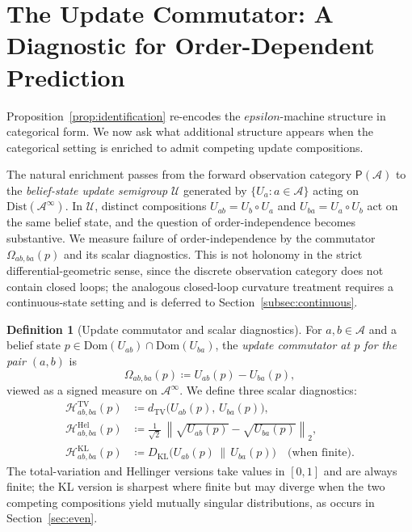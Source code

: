 \documentclass[11pt,a4paper]{article}
\def\varepsilon{epsilon}%
\theoremstyle{plain}
\theoremstyle{definition}
\newtheorem{definition}[theorem]{Definition}
\theoremstyle{remark}
\newcommand{\Dist}{\mathrm{Dist}}
\newcommand{\KL}{D_{\mathrm{KL}}}
\newcommand{\TV}{d_{\mathrm{TV}}}
\newcommand{\eqdef}{\coloneqq}
\newcommand{\PathCat}{\mathsf{P}}
\newcommand{\Alphabet}{\mathcal{A}}
\newcommand{\Dom}{\mathrm{Dom}}
\begin{document}
\section{The Update Commutator: A Diagnostic for Order-Dependent Prediction}
\label{sec:commutator}

Proposition~\ref{prop:identification} re-encodes the $\varepsilon$-machine structure in categorical form. We now ask what additional structure appears when the categorical setting is enriched to admit competing update compositions.

The natural enrichment passes from the forward observation category $\PathCat(\Alphabet)$ to the \emph{belief-state update semigroup} $\mathcal{U}$ generated by $\{ U_a : a \in \Alphabet \}$ acting on $\Dist(\Alphabet^\infty)$. In $\mathcal{U}$, distinct compositions $U_{ab} = U_b \circ U_a$ and $U_{ba} = U_a \circ U_b$ act on the same belief state, and the question of order-independence becomes substantive. We measure failure of order-independence by the commutator $\Omega_{ab,ba}(p)$ and its scalar diagnostics. This is not holonomy in the strict differential-geometric sense, since the discrete observation category does not contain closed loops; the analogous closed-loop curvature treatment requires a continuous-state setting and is deferred to Section~\ref{subsec:continuous}.

\begin{definition}[Update commutator and scalar diagnostics]
\label{def:commutator}
For $a, b \in \Alphabet$ and a belief state $p \in \Dom(U_{ab}) \cap \Dom(U_{ba})$, the \emph{update commutator at $p$ for the pair $(a, b)$} is
\begin{equation}
    \Omega_{ab,ba}(p) \eqdef U_{ab}(p) - U_{ba}(p),
\end{equation}
viewed as a signed measure on $\Alphabet^\infty$. We define three scalar diagnostics:
\begin{align}
    \mathcal{H}^{\mathrm{TV}}_{ab,ba}(p) &\eqdef \TV\bigl(U_{ab}(p),\, U_{ba}(p)\bigr), \\
    \mathcal{H}^{\mathrm{Hel}}_{ab,ba}(p) &\eqdef \frac{1}{\sqrt{2}} \,\left\| \sqrt{U_{ab}(p)} - \sqrt{U_{ba}(p)} \right\|_2, \\
    \mathcal{H}^{\mathrm{KL}}_{ab,ba}(p) &\eqdef \KL\bigl(U_{ab}(p) \,\bigl\|\, U_{ba}(p)\bigr) \quad \text{(when finite)}.
\end{align}
The total-variation and Hellinger versions take values in $[0, 1]$ and are always finite; the KL version is sharpest where finite but may diverge when the two competing compositions yield mutually singular distributions, as occurs in Section~\ref{sec:even}.
\end{definition}
\end{document}
